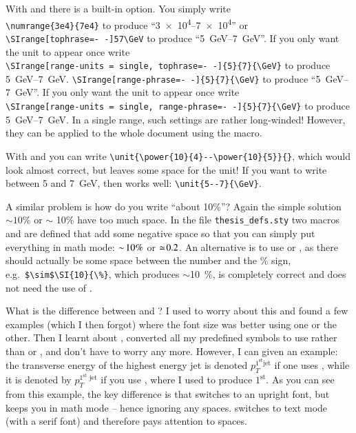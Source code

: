 With  and  there
is a built-in option. You simply write\\
\verb+\numrange{3e4}{7e4}+
to produce \enquote{\numrange{3e4}{7e4}} or\\
 {%
  \texttt{\textbackslash SIrange[tophrase=-\,-]{5}{7}{\textbackslash GeV}}
  to produce \enquote{\SIrange[tophrase=--]{5}{7}{\GeV}}.
  If you only want the unit to appear once write\\
  \texttt{\textbackslash SIrange[range-units = single, tophrase=-\,-]\{5\}\{7\}\{\textbackslash GeV\}}
  to produce
  \SIrange[trapambigrange=false, tophrase=--]{5}{7}{\GeV}.
}{%
  \texttt{\textbackslash SIrange[range-phrase=-\,-]\{5\}\{7\}\{\textbackslash GeV\}}
  to produce \enquote{\SIrange[range-phrase=--]{5}{7}{\GeV}}.
  If you only want the unit to appear once write\\
  \texttt{\textbackslash SIrange[range-units = single, range-phrase=-\,-]\{5\}\{7\}\{\textbackslash GeV\}}
  to produce
  \SIrange[range-units = single, range-phrase=--]{5}{7}{\GeV}.
}
In a single range, such settings are rather long-winded!
However, they can be applied to the whole
document using the  macro.

With  and  you can write
\verb+\unit{\power{10}{4}--\power{10}{5}}{}+, which would look almost
correct, but leaves some space for the unit! If you want to write
between 5 and \SI{7}{\GeV}, then  works well:
\verb+\unit{5--7}{\GeV}+.

A similar problem is how do you write \enquote{about 10\%}?  Again the
simple solution $\sim 10\%$ or $\sim$ 10\% have too much space. In the
file \texttt{thesis\_defs.sty} two macros  and
 are defined that add some negative space so that you
can simply put everything in math mode: $\sim\! 10\%$ or $\simeq\!
0.2$. An alternative is to use  or , as there
should actually be some space between the number and the \% sign,
e.g.\ \verb+$\sim$\SI{10}{\%}+, which produces $\sim$\SI{10}{\%}, is
completely correct and does not need the use of .

What is the difference between  and
? I used to worry about this and found a
few examples (which I then forgot) where the font size was better
using one or the other. Then I learnt about ,
converted all my predefined symbols to use  rather than
 or , and don't have to worry any
more. However, I can given an example: the transverse energy of the
highest energy jet is denoted $p_{T}^{\mathrm{1^{\text{st}} jet}}$ if
one uses , while it is denoted by
$p_{T}^{\textrm{1$^{\text{st}}$ jet}}$ if you use ,
where I used  to produce $1^{\text{st}}$.  As you can see
from this example, the key difference is that  switches
to an upright font, but keeps you in math mode -- hence ignoring any
spaces.  switches to text mode (with a serif font) and
therefore pays attention to spaces.


